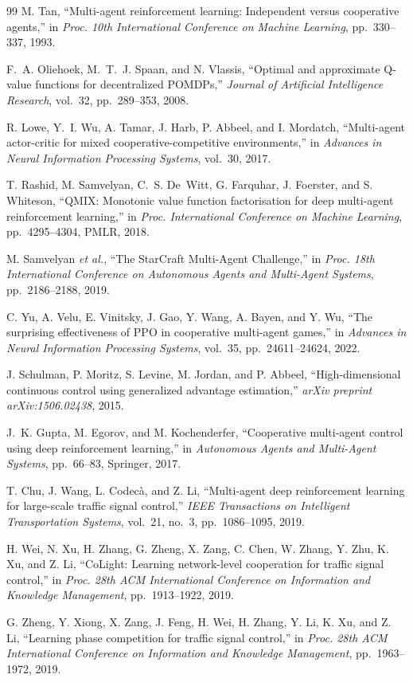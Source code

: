 \documentclass[11pt, a4paper]{report}
\begin{document}
\begin{thebibliography}{99}
M. Tan,
``Multi-agent reinforcement learning: Independent versus cooperative agents,''
in \textit{Proc. 10th International Conference on Machine Learning}, pp.~330--337, 1993.

F.~A. Oliehoek, M.~T.~J. Spaan, and N. Vlassis,
``Optimal and approximate Q-value functions for decentralized POMDPs,''
\textit{Journal of Artificial Intelligence Research}, vol.~32, pp.~289--353, 2008.

R. Lowe, Y.~I. Wu, A. Tamar, J. Harb, P. Abbeel, and I. Mordatch,
``Multi-agent actor-critic for mixed cooperative-competitive environments,''
in \textit{Advances in Neural Information Processing Systems}, vol.~30, 2017.

T. Rashid, M. Samvelyan, C.~S. De~Witt, G. Farquhar, J. Foerster, and S. Whiteson,
``{QMIX}: Monotonic value function factorisation for deep multi-agent reinforcement learning,''
in \textit{Proc. International Conference on Machine Learning}, pp.~4295--4304, PMLR, 2018.

M. Samvelyan \textit{et al.},
``The {StarCraft} Multi-Agent Challenge,''
in \textit{Proc. 18th International Conference on Autonomous Agents and Multi-Agent Systems}, pp.~2186--2188, 2019.

C. Yu, A. Velu, E. Vinitsky, J. Gao, Y. Wang, A. Bayen, and Y. Wu,
``The surprising effectiveness of {PPO} in cooperative multi-agent games,''
in \textit{Advances in Neural Information Processing Systems}, vol.~35, pp.~24611--24624, 2022.

J. Schulman, P. Moritz, S. Levine, M. Jordan, and P. Abbeel,
``High-dimensional continuous control using generalized advantage estimation,''
\textit{arXiv preprint arXiv:1506.02438}, 2015.

J.~K. Gupta, M. Egorov, and M. Kochenderfer,
``Cooperative multi-agent control using deep reinforcement learning,''
in \textit{Autonomous Agents and Multi-Agent Systems}, pp.~66--83, Springer, 2017.

T. Chu, J. Wang, L. Codec\`{a}, and Z. Li,
``Multi-agent deep reinforcement learning for large-scale traffic signal control,''
\textit{IEEE Transactions on Intelligent Transportation Systems}, vol.~21, no.~3, pp.~1086--1095, 2019.

H. Wei, N. Xu, H. Zhang, G. Zheng, X. Zang, C. Chen, W. Zhang, Y. Zhu, K. Xu, and Z. Li,
``{CoLight}: Learning network-level cooperation for traffic signal control,''
in \textit{Proc. 28th ACM International Conference on Information and Knowledge Management}, pp.~1913--1922, 2019.

G. Zheng, Y. Xiong, X. Zang, J. Feng, H. Wei, H. Zhang, Y. Li, K. Xu, and Z. Li,
``Learning phase competition for traffic signal control,''
in \textit{Proc. 28th ACM International Conference on Information and Knowledge Management}, pp.~1963--1972, 2019.

\end{thebibliography}
\end{document}
